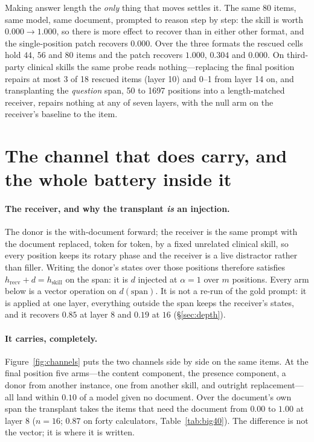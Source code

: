 \documentclass{article}
\newcommand{\dvec}{\ensuremath{d}}
\begin{document}
Making answer length the \emph{only} thing that moves settles it. The same 80
items, same model, same document, prompted to reason step by step: the skill is
worth $0.000 \to 1.000$, so there is more effect to recover than in either other
format, and the single-position patch recovers $\mathbf{0.000}$. Over the three
formats the rescued cells hold $44$, $56$ and $80$ items and the patch recovers
$1.000$, $0.304$ and $0.000$. On third-party clinical skills the same probe reads
nothing---replacing the final position repairs at most 3 of 18 rescued items (layer 10) and 0--1 from layer 14 on, and
transplanting the \emph{question} span, 50 to 1697 positions into a
length-matched receiver, repairs nothing at any of seven layers, with the null
arm on the receiver's baseline to the item.


\section{The channel that does carry, and the whole battery inside it}
\label{sec:battery}

\paragraph{The receiver, and why the transplant \emph{is} an injection.} The
donor is the with-document forward; the receiver is the same prompt with the
document replaced, token for token, by a fixed unrelated clinical skill, so
every position keeps its rotary phase and the receiver is a live distractor
rather than filler. Writing the donor's states over those positions therefore
satisfies $h_{\text{recv}} + \dvec = h_{\text{skill}}$ on the span: it is $\dvec$ injected at $\alpha=1$ over $m$
positions. Every arm below is a vector operation on $\dvec(\text{span})$. It is
not a re-run of the gold prompt: it is applied at one layer, everything outside
the span keeps the receiver's states, and it recovers $0.85$ at layer $8$ and
$0.19$ at $16$ (\S\ref{sec:depth}).


\paragraph{It carries, completely.} Figure~\ref{fig:channels} puts the two
channels side by side on the same items. At the final position five arms---the
content component, the presence component, a donor from another instance, one
from another skill, and outright replacement---all land within $0.10$ of a model
given no document. Over the document's own span the transplant takes the
items that need the document from $0.00$ to $1.00$ at layer $8$ ($n=16$;
$0.87$ on forty calculators, Table~\ref{tab:big40}). The difference is not the
vector; it is where it is written.
\end{document}
